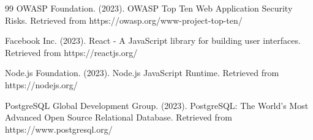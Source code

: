 \documentclass[12pt,a4paper]{report}
\begin{document}
\begin{thebibliography}{99}
OWASP Foundation. (2023). OWASP Top Ten Web Application Security Risks. Retrieved from https://owasp.org/www-project-top-ten/

Facebook Inc. (2023). React - A JavaScript library for building user interfaces. Retrieved from https://reactjs.org/

Node.js Foundation. (2023). Node.js JavaScript Runtime. Retrieved from https://nodejs.org/

PostgreSQL Global Development Group. (2023). PostgreSQL: The World's Most Advanced Open Source Relational Database. Retrieved from https://www.postgresql.org/

\end{thebibliography}
\end{document}
